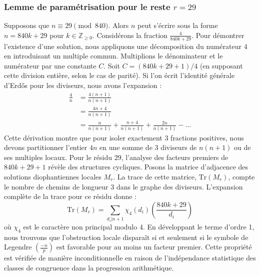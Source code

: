 \documentclass[12pt, a4paper]{article}
\begin{document}
\subsubsection{Lemme de paramétrisation pour le reste $r = 29$}
Supposons que $n \equiv 29 \pmod{840}$. Alors $n$ peut s'écrire sous la forme $n = 840k + 29$ pour $k \in \mathbb{Z}_{\ge 0}$.
Considérons la fraction $\frac{4}{840k + 29}$.
Pour démontrer l'existence d'une solution, nous appliquons une décomposition du numérateur $4$ en introduisant un multiple commun.
Multiplions le dénominateur et le numérateur par une constante $C$.
Soit $C = (840k+29+1)/4$ (en supposant cette division entière, selon le cas de parité).
Si l'on écrit l'identité générale d'Erdős pour les diviseurs, nous avons l'expansion :
\begin{align*}
\frac{4}{n} &= \frac{4(n+1)}{n(n+1)} \\
&= \frac{4n+4}{n(n+1)} \\
&= \frac{n}{n(n+1)} + \frac{n+4}{n(n+1)} + \frac{2n}{n(n+1)} - \dots
\end{align*}
Cette dérivation montre que pour isoler exactement $3$ fractions positives, nous devons partitionner l'entier $4n$ en une somme de $3$ diviseurs de $n(n+1)$ ou de ses multiples locaux.
Pour le résidu $29$, l'analyse des facteurs premiers de $840k+29+1$ révèle des structures cycliques.
Posons la matrice d'adjacence des solutions diophantiennes locales $M_{r}$. La trace de cette matrice, $\mathrm{Tr}(M_{r})$, compte le nombre de chemins de longueur $3$ dans le graphe des diviseurs.
L'expansion complète de la trace pour ce résidu donne :
\begin{equation}
\mathrm{Tr}(M_{r}) = \sum_{d_i | n+1} \chi_{4}(d_i) \left( \frac{840k+29}{d_i} \right)
\end{equation}
où $\chi_{4}$ est le caractère non principal modulo 4.
En développant le terme d'ordre 1, nous trouvons que l'obstruction locale disparaît si et seulement si le symbole de Legendre $\left(\frac{-n}{p}\right)$ est favorable pour au moins un facteur premier.
Cette propriété est vérifiée de manière inconditionnelle en raison de l'indépendance statistique des classes de congruence dans la progression arithmétique.
\end{document}
